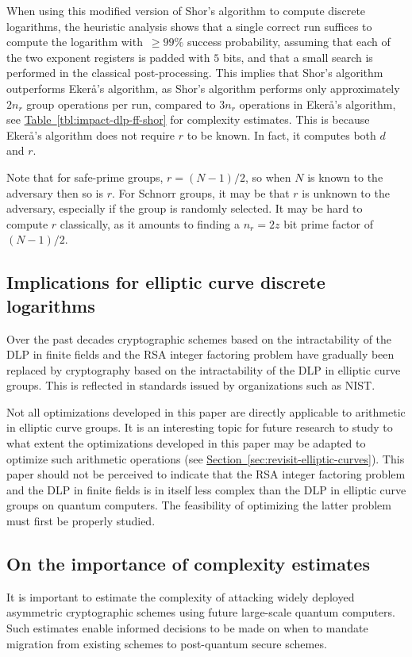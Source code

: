 \documentclass[a4paper, onecolumn, accepted=2021-03-29]{quantumarticle}
\renewcommand{\sec}[1]{\hyperref[sec:#1]{Section~\ref*{sec:#1}}}
\newcommand{\tbl}[1]{\hyperref[tbl:#1]{Table~\ref*{tbl:#1}}}
\begin{document}
When using this modified version of Shor's algorithm to compute discrete logarithms, the heuristic analysis \cite{ekeraa2019revisiting} shows that a single correct run suffices to compute the logarithm with~$\ge 99\%$ success probability, assuming that each of the two exponent registers is padded with $5$ bits, and that a small search is performed in the classical post-processing.
This implies that Shor's algorithm outperforms Ekerå's algorithm, as Shor's algorithm performs only approximately $2n_r$ group operations per run, compared to $3n_r$ operations in Ekerå's algorithm, see \tbl{impact-dlp-ff-shor} for complexity estimates. This is because Ekerå's algorithm does not require $r$ to be known. In fact, it computes both $d$ and $r$.

Note that for safe-prime groups, $r = (N-1)/2$, so when $N$ is known to the adversary then so is $r$. For Schnorr groups, it may be that $r$ is unknown to the adversary, especially if the group is randomly selected. It may be hard to compute $r$ classically, as it amounts to finding a $n_r = 2z$ bit prime factor of $(N-1)/2$.

\subsection{Implications for elliptic curve discrete logarithms}
Over the past decades cryptographic schemes based on the intractability of the DLP in finite fields and the RSA integer factoring problem have gradually been replaced by cryptography based on the intractability of the DLP in elliptic curve groups. This is reflected in standards issued by organizations such as NIST.

Not all optimizations developed in this paper are directly applicable to arithmetic in elliptic curve groups. It is an interesting topic for future research to study to what extent the optimizations developed in this paper may be adapted to optimize such arithmetic operations (see \sec{revisit-elliptic-curves}). This paper should not be perceived to indicate that the RSA integer factoring problem and the DLP in finite fields is in itself less complex than the DLP in elliptic curve groups on quantum computers. The feasibility of optimizing the latter problem must first be properly studied.

\subsection{On the importance of complexity estimates}
It is important to estimate the complexity of attacking widely deployed asymmetric cryptographic schemes using future large-scale quantum computers. Such estimates enable informed decisions to be made on when to mandate migration from existing schemes to post-quantum secure schemes.
\end{document}

